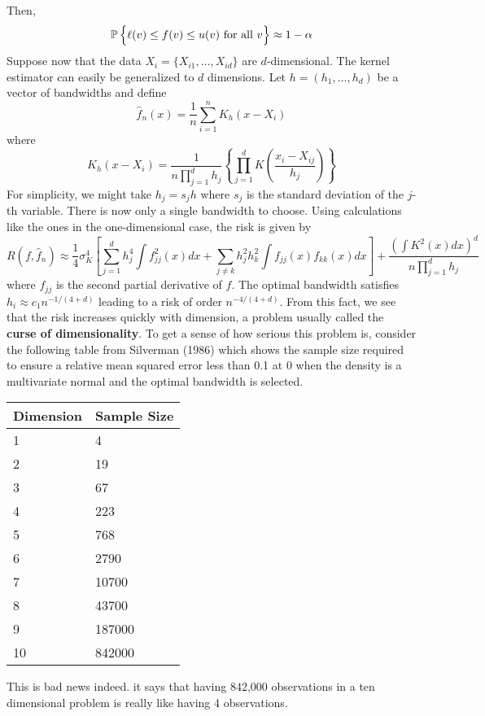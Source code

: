 Then,
\[
\operatorname{\mathbb{P}} \Big\{ \ell(v) \leq f(v) \leq u(v) \text{ for all } v \Big\} \approx 1 - \alpha
\]
Suppose now that the data \(X_{i} = \{ X_{i1}, \dots, X_{id} \}\) are \(d\)-dimensional. The kernel estimator can easily be generalized to \(d\) dimensions. Let \(h = (h_{1}, \dots, h_d)\) be a vector of bandwidths and define
\[
\hat{f}_{n}(x) = \frac{1}{n} \sum_{i=1}^{n} K_h(x - X_{i})
\]
where
\[
K_h(x - X_{i}) = \frac{1}{n \prod_{j=1}^{d} h_{j}} \left\{ \prod_{j=1}^{d} K \left( \frac{x_{i} - X_{ij}}{h_{j}} \right) \right\}
\]
For simplicity, we might take \(h_{j} = s_{j} h\) where \(s_{j}\) is the
standard deviation of the \(j\)-th variable. There is now only a single
bandwidth to choose. Using calculations like the ones in the
one-dimensional case, the risk is given by
\[
R(f, \hat{f}_{n}) 
\approx \frac{1}{4} \sigma_K^{4} \left[ \sum_{j=1}^{d} h_{j}^{4} \int f_{jj}^{2}(x) dx + \sum_{j \neq k} h_{j}^{2} h_{k}^{2} \int f_{jj}(x) f_{kk}(x) dx \right] + \frac{\left( \int K^{2}(x) dx\right)^{d}}{n \prod_{j=1}^{d} h_{j}}
\]
where \(f_{jj}\) is the second partial derivative of \(f\).
The optimal bandwidth satisfies \(h_{i} \approx c_{1} n^{-1/(4 + d)}\) leading to a risk of order \(n^{-4/(4+d)}\). From this fact, we see that the risk increases quickly with dimension, a problem usually called the \textbf{curse of dimensionality}. To get a sense of how serious this problem is, consider the following table from Silverman (1986) which shows the sample size required to ensure a relative mean squared error less than 0.1 at 0 when the density is a multivariate normal and the optimal bandwidth is selected.
\begin{table}[H]
\centering
\begin{tabular}{@{}ll@{}}
\toprule
Dimension & Sample Size \\
\midrule
1 & 4 \\
2 & 19 \\
3 & 67 \\
4 & 223 \\
5 & 768 \\
6 & 2790 \\
7 & 10700 \\
8 & 43700 \\
9 & 187000 \\
10 & 842000 \\
\bottomrule
\end{tabular}
\end{table}
This is bad news indeed. it says that having 842,000 observations in a ten dimensional problem is really like having 4 observations.

